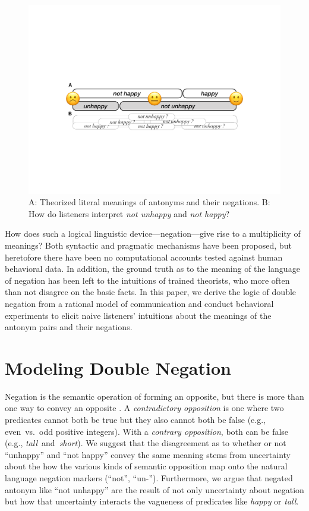 \documentclass[floatsintext,doc]{apa6}
\begin{document}
\begin{figure}[b]
\centering \includegraphics{figs/happy-scale-2}  
\caption{A: Theorized literal meanings of antonyms and their negations. B: How do listeners interpret \emph{not unhappy} and \emph{not happy}? }\label{fig:happy-scale}
\end{figure}

How does such a logical linguistic device---negation---give rise to a multiplicity of meanings?
Both syntactic \cite{Cable2017} and pragmatic \cite{Rett2014:eval} mechanisms have been proposed, but heretofore there have been no computational accounts tested against human behavioral data.
In addition, the ground truth as to the meaning of the language of negation has been left to the intuitions of trained theorists, who more often than not disagree on the basic facts. %
In this paper, we derive the logic of double negation from a rational model of communication and conduct behavioral experiments to elicit naive listeners' intuitions about the meanings of the antonym pairs and their negations. 

\section{Modeling Double Negation}

Negation is the semantic operation of forming an opposite, but there is more than one way to convey an opposite \cite{Horn1989:Natural}. 
A \emph{contradictory opposition} is one where two predicates cannot both be true but they also cannot both be false (e.g., even~vs.~odd positive integers). 
With a \emph{contrary opposition}, both can be false (e.g., \emph{tall}~and~\emph{short}). 
We suggest that the disagreement as to whether or not \enquote{unhappy} and \enquote{not happy} convey the same meaning stems from uncertainty about the how the various kinds of semantic opposition map onto the natural language negation markers  (\enquote{not}, \enquote{un-}).
Furthermore, we argue that negated antonym like \enquote{not unhappy} are the result of not only uncertainty about negation but how that uncertainty interacts the vagueness of predicates like \emph{happy} or \emph{tall}.
\end{document}
